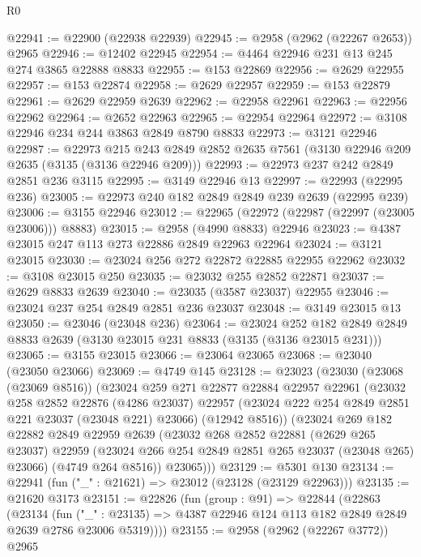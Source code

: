 \begin{lexlean}{R0}
\begin{coremodule}
@22941 := @22900 (@22938 @22939)
@22945 := @2958 (@2962 (@22267 @2653)) @2965
@22946 := @12402 @22945
@22954 := @4464 @22946 @231 @13 @245 @274 @3865 @22888 @8833
@22955 := @153 @22869
@22956 := @2629 @22955
@22957 := @153 @22874
@22958 := @2629 @22957
@22959 := @153 @22879
@22961 := @2629 @22959 @2639
@22962 := @22958 @22961
@22963 := @22956 @22962
@22964 := @2652 @22963
@22965 := @22954 @22964
@22972 := @3108 @22946 @234 @244 @3863 @2849 @8790 @8833
@22973 := @3121 @22946
@22987 := @22973
    @215
    @243
    @2849
    @2852
    @2635
    @7561
    (@3130 @22946 @209 @2635 (@3135 (@3136 @22946 @209)))
@22993 := @22973 @237 @242 @2849 @2851 @236 @3115
@22995 := @3149 @22946 @13
@22997 := @22993 (@22995 @236)
@23005 := @22973 @240 @182 @2849 @2849 @239 @2639 (@22995 @239)
@23006 := @3155 @22946
@23012 := @22965 (@22972 (@22987 (@22997 (@23005 @23006))) @8883)
@23015 := @2958 (@4990 @8833) @22946
@23023 := @4387 @23015 @247 @113 @273 @22886 @2849 @22963 @22964
@23024 := @3121 @23015
@23030 := @23024 @256 @272 @22872 @22885 @22955 @22962
@23032 := @3108 @23015 @250
@23035 := @23032 @255 @2852 @22871
@23037 := @2629 @8833 @2639
@23040 := @23035 (@3587 @23037) @22955
@23046 := @23024 @237 @254 @2849 @2851 @236 @23037
@23048 := @3149 @23015 @13
@23050 := @23046 (@23048 @236)
@23064 := @23024
    @252
    @182
    @2849
    @2849
    @8833
    @2639
    (@3130 @23015 @231 @8833 (@3135 (@3136 @23015 @231)))
@23065 := @3155 @23015
@23066 := @23064 @23065
@23068 := @23040 (@23050 @23066)
@23069 := @4749 @145
@23128 := @23023
    (@23030
      (@23068 (@23069 @8516))
      (@23024
        @259
        @271
        @22877
        @22884
        @22957
        @22961
        (@23032
          @258
          @2852
          @22876
          (@4286 @23037)
          @22957
          (@23024 @222 @254 @2849 @2851 @221 @23037 (@23048 @221) @23066)
          (@12942 @8516))
        (@23024
          @269
          @182
          @22882
          @2849
          @22959
          @2639
          (@23032
            @268
            @2852
            @22881
            (@2629 @265 @23037)
            @22959
            (@23024 @266 @254 @2849 @2851 @265 @23037 (@23048 @265) @23066)
            (@4749 @264 @8516))
          @23065)))
@23129 := @5301 @130
@23134 := @22941 (fun ("_" : @21621) => @23012 (@23128 (@23129 @22963)))
@23135 := @21620 @3173
@23151 := @22826
    (fun (group : @91) =>
    @22844
      (@22863
        (@23134
          (fun ("_" : @23135) =>
          @4387 @22946 @124 @113 @182 @2849 @2849 @2639 @2786 @23006 @5319))))
@23155 := @2958 (@2962 (@22267 @3772)) @2965

\end{coremodule}
\end{lexlean}
